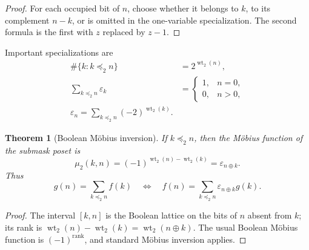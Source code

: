 \documentclass[11pt,oneside]{article}
\numberwithin{equation}{section}
\newtheorem{theorem}{Theorem}[section]
\theoremstyle{definition}
\theoremstyle{remark}
\newcommand{\wt}{\operatorname{wt}_2}
\newcommand{\eps}{\varepsilon}
\newcommand{\xor}{\mathbin{\oplus}}
\newcommand{\submask}{\mathrel{\preccurlyeq_2}}
\begin{document}
\begin{proof}
For each occupied bit of \(n\), choose whether it belongs to \(k\), to its
complement \(n-k\), or is omitted in the one-variable specialization.
The second formula is the first with \(z\) replaced by \(z-1\).
\end{proof}

Important specializations are
\begin{align}
  \#\{k:k\submask n\}&=2^{\wt(n)},
  \label{p1:eq:submask-count}\\
  \sum_{k\submask n}\eps_k
  &=\begin{cases}1,&n=0,\\0,&n>0,\end{cases}
  \label{p1:eq:submask-cancellation}\\
  \boxed{
  \eps_n=\sum_{k\submask n}(-2)^{\wt(k)}.}
  \label{p1:eq:submask-reconstruction}
\end{align}

\begin{theorem}[Boolean M\"obius inversion]
\label{p1:thm:boolean-mobius}
If \(k\submask n\), then the M\"obius function of the submask poset is
\begin{equation}
  \mu_2(k,n)=(-1)^{\wt(n)-\wt(k)}=\eps_{n\xor k}.
  \label{p1:eq:boolean-mobius}
\end{equation}
Thus
\begin{equation}
  g(n)=\sum_{k\submask n}f(k)
  \quad\Longleftrightarrow\quad
  \boxed{
  f(n)=\sum_{k\submask n}\eps_{n\xor k}g(k).}
  \label{p1:eq:boolean-mobius-inversion}
\end{equation}
\end{theorem}

\begin{proof}
The interval \([k,n]\) is the Boolean lattice on the bits of \(n\) absent
from \(k\); its rank is \(\wt(n)-\wt(k)=\wt(n\xor k)\).  The usual Boolean
M\"obius function is \((-1)^{\text{rank}}\), and standard M\"obius inversion
applies.
\end{proof}
\end{document}
